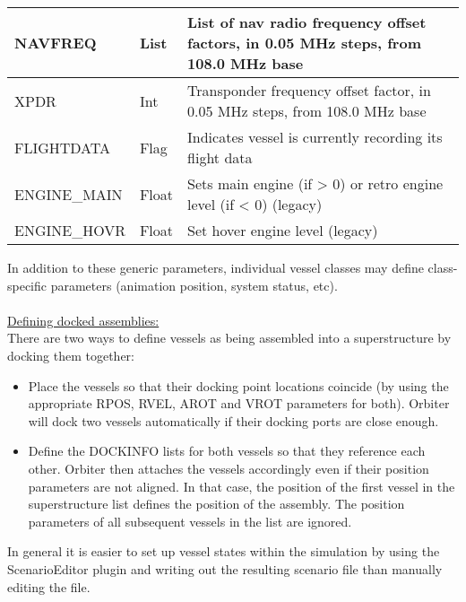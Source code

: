\documentclass[Orbiter Developer Manual.tex]{subfiles}
\begin{document}
\begin{longtable}{ |p{}|p{}|p{}| }
	\hline\rule{0pt}{2ex}
	NAVFREQ & List & List of nav radio frequency offset factors, in 0.05 MHz steps, from 108.0 MHz base\\
	\hline\rule{0pt}{2ex}
	XPDR & Int & Transponder frequency offset factor, in 0.05 MHz steps, from 108.0 MHz base\\
	\hline\rule{0pt}{2ex}
	FLIGHTDATA & Flag & Indicates vessel is currently recording its flight data\\
	\hline\rule{0pt}{2ex}
	ENGINE\_MAIN & Float & Sets main engine (if > 0) or retro engine level (if < 0) (legacy)\\
	\hline\rule{0pt}{2ex}
	ENGINE\_HOVR & Float & Set hover engine level (legacy)\\
	\hline
	\end{longtable}

\noindent
In addition to these generic parameters, individual vessel classes may define class-specific parameters (animation position, system status, etc).\\
\\
\underline{Defining docked assemblies:}\\
There are two ways to define vessels as being assembled into a superstructure by docking them together:

\begin{itemize}
\item Place the vessels so that their docking point locations coincide (by using the appropriate RPOS, RVEL, AROT and VROT parameters for both). Orbiter will dock two vessels automatically if their docking ports are close enough.
\item Define the DOCKINFO lists for both vessels so that they reference each other. Orbiter then attaches the vessels accordingly even if their position parameters are not aligned. In that case, the position of the first vessel in the superstructure list defines the position of the assembly. The position parameters of all subsequent vessels in the list are ignored.
\end{itemize}

\noindent
In general it is easier to set up vessel states within the simulation by using the ScenarioEditor plugin and writing out the resulting scenario file than manually editing the file.
\end{document}
